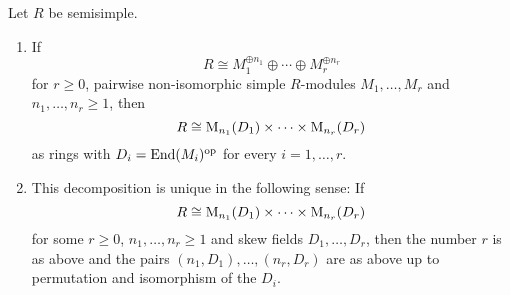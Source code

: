 %   


\begin{theorem}
  \label{theorem: artin wedderburn theorem}
  Let $R$ be semisimple.
  \begin{enumerate}
    \item
      If
      \[
              R
        \cong M_1^{\oplus n_1} \oplus \dotsb \oplus M_r^{\oplus n_r}
      \]
      for $r \geq 0$, pairwise non-isomorphic simple $R$-modules $M_1, \dotsc, M_r$ and $n_1, \dotsc, n_r \geq 1$, then
      \[
              R
        \cong \operatorname{M}_{n_1}(D_1) \times \dotsb \times  \operatorname{M}_{n_r}(D_r)
      \]
      as rings with $D_i = \operatorname{End}(M_i)^{\mathrm{op}}$ for every $i = 1, \dotsc, r$.
      \item
      This decomposition is unique in the following sense:
      If
      \[
              R
        \cong \operatorname{M}_{n_1}(D_1) \times \dotsb \times  \operatorname{M}_{n_r}(D_r)
      \]
      for some $r \geq 0$, $n_1, \dotsc, n_r \geq 1$ and skew fields $D_1, \dotsc, D_r$, then the number $r$ is as above and the pairs $(n_1,D_1), \dotsc, (n_r,D_r)$ are as above up to permutation and isomorphism of the $D_i$.
  \end{enumerate}
\end{theorem}


